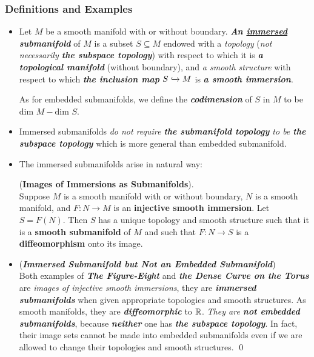 \documentclass[11pt]{article}
\begin{document}
\subsubsection{Definitions and Examples}
\begin{itemize}
\item \begin{definition}
Let $M$ be a smooth manifold with or without boundary. \textit{\textbf{An \underline{immersed} submanifold}} of $M$ is a subset $S \subseteq M$ endowed with a \emph{topology} (\emph{not necessarily \textbf{the subspace topology}}) with respect to which it is \emph{\textbf{a topological manifold}} (without boundary), and \emph{a smooth structure} with respect to which \emph{\textbf{the inclusion map}} $S \xhookrightarrow{} M$ is \emph{\textbf{a smooth immersion}}. 

As for embedded submanifolds, we define the \emph{\textbf{codimension}} of $S$ in $M$ to be $\text{dim }M - \text{dim }S$.
\end{definition}

\item \begin{remark}
Immersed submanifolds \emph{do not require \textbf{the submanifold topology} to be \textbf{the subspace topology}} which is more general than embedded submanifold. 
\end{remark}

\item The immersed submanifolds arise in natural way:
\begin{proposition} (\textbf{Images of Immersions as Submanifolds}). \citep{lee2003introduction} \\
Suppose $M$ is a smooth manifold with or without boundary, $N$ is a smooth manifold, and $F: N \rightarrow M$ is an \textbf{injective smooth immersion}. Let $S = F(N)$. Then $S$ has a unique topology and smooth structure such that it is a \textbf{smooth submanifold} of $M$ and such that $F: N \rightarrow S$ is a \textbf{diffeomorphism} onto its image.
\end{proposition}

\item \begin{example} (\emph{\textbf{Immersed Submanifold but Not an Embedded Submanifold}})\\
Both examples of \emph{\textbf{The Figure-Eight}} and \emph{\textbf{the Dense Curve on the Torus}} are \emph{images of injective smooth immersions}, they are \emph{\textbf{immersed submanifolds}} when given appropriate topologies and smooth structures. As smooth manifolds, they are \emph{\textbf{diffeomorphic}} to ${\mathbb R}$. \emph{They are \textbf{not embedded submanifolds}}, because \emph{\textbf{neither}} one has \emph{\textbf{the subspace topology}}. In fact, their image sets cannot be made into embedded submanifolds even if we are allowed to change their topologies and smooth structures. \qed
\end{example}


\end{itemize}
\end{document}

